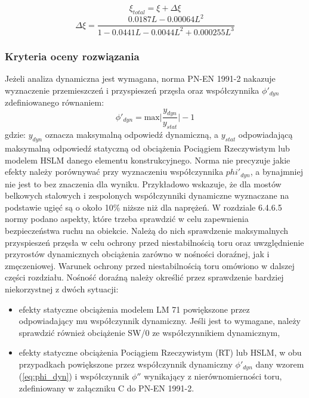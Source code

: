 \begin{equation} \label{eq:total_damp_ec}
	\xi_{total}=\xi + \Delta \xi
\end{equation}
\begin{equation} \label{eq:additional_damp_ec}
	\Delta \xi =\frac{0.0187L-0.00064L^2}{1-0.0441L-0.0044L^2+0.000255L^3}
\end{equation}








\subsubsection{Kryteria oceny rozwiązania} \label{sect: eurokod_kryteria_oceny}
Jeżeli analiza dynamiczna jest wymagana, norma PN-EN 1991-2 nakazuje wyznaczenie przemieszczeń i przyspieszeń przęsła oraz współczynnika $\phi'_{dyn}$ zdefiniowanego równaniem:
\begin{equation} \label{eq:phi_dyn}
	\phi '_{dyn} = \text{max}\Big| \frac{y_{dyn}}{y_{stat}} \Big| -1
\end{equation}
gdzie: $y_{dyn}$ oznacza maksymalną odpowiedź dynamiczną, a $y_{stat}$ odpowiadającą maksymalną odpowiedź statyczną od obciążenia Pociągiem Rzeczywistym lub modelem HSLM danego elementu konstrukcyjnego. Norma nie precyzuje jakie efekty należy porównywać przy wyznaczeniu współczynnika $phi '_{dyn}$, a bynajmniej nie jest to bez znaczenia dla wyniku. Przykładowo \cite{Klasztorny2005} wskazuje, że dla mostów belkowych stalowych i zespolonych współczynniki dynamiczne wyznaczane na podstawie ugięć są o około 10\% niższe niż dla naprężeń. W rozdziale 6.4.6.5 normy podano aspekty, które trzeba sprawdzić w celu zapewnienia bezpieczeństwa ruchu na obiekcie. Należą do nich sprawdzenie maksymalnych przyspieszeń przęsła w celu ochrony przed niestabilnością toru oraz uwzględnienie przyrostów dynamicznych obciążenia zarówno w nośności doraźnej, jak i zmęczeniowej.
Warunek ochrony przed niestabilnością toru omówiono w dalszej części rozdziału. Nośność doraźną należy określić przez sprawdzenie bardziej niekorzystnej z dwóch sytuacji:
\begin{itemize}
	\item efekty statyczne obciążenia modelem LM 71 powiększone przez odpowiadający mu współczynnik dynamiczny. Jeśli jest to wymagane, należy sprawdzić również obciążenie SW/0 ze współczynnikiem dynamicznym,
	\item efekty statyczne obciążenia Pociągiem Rzeczywistym (RT) lub HSLM, w obu przypadkach powiększone przez współczynnik dynamiczny $\phi '_{dyn}$ dany wzorem (\ref{eq:phi_dyn}) i współczynnik $\phi''$ wynikający z nierównomierności toru, zdefiniowany w załączniku C do PN-EN 1991-2.
\end{itemize}
